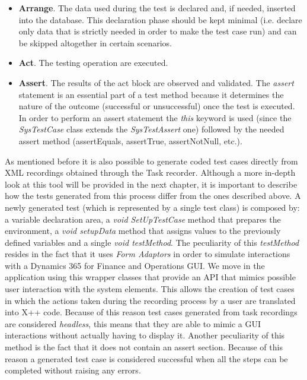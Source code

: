 \begin{itemize}
    \item \textbf{Arrange}. The data used during the test is declared and, if needed, inserted into the database. This declaration phase should be kept minimal (i.e. declare only data that is strictly needed in order to make the test case run) and can be skipped altogether in certain scenarios.
    \item \textbf{Act}. The testing operation are executed.
    \item \textbf{Assert}. The results of the act block are observed and validated. The \textit{assert} statement is an essential part of a test method because it determines the nature of the outcome (successful or unsuccessful) once the test is executed. In order to perform an assert statement the \textit{this} keyword is used (since the \textit{SysTestCase} class extends the \textit{SysTestAssert} one) followed by the needed assert method (assertEquals, assertTrue, assertNotNull, etc.).
\end{itemize}

As mentioned before it is also possible to generate coded test cases directly from XML recordings obtained through the Task recorder. Although a more in-depth look at this tool will be provided in the next chapter, it is important to describe how the tests generated from this process differ from the ones described above. 
A newly generated test (which is represented by a single test class) is composed by: a variable declaration area, a \textit{void SetUpTestCase} method that prepares the environment, a \textit{void setupData} method that assigns values to the previously defined variables and a single \textit{void testMethod}. The peculiarity of this \textit{testMethod} resides in the fact that it uses \textit{Form Adaptors} in order to simulate interactions with a Dynamics 365 for Finance and Operations GUI. We move in the application using this wrapper classes that provide an API that mimics possible user interaction with the system elements. This allows the creation of test cases in which the actions taken during the recording process by a user are translated into X++ code. Because of this reason test cases generated from task recordings are considered \textit{headless}, this means that they are able to mimic a GUI interactions without actually having to display it. Another peculiarity of this method is the fact that it does not contain an assert section. Because of this reason a generated test case is considered successful when all the steps can be completed without raising any errors.

